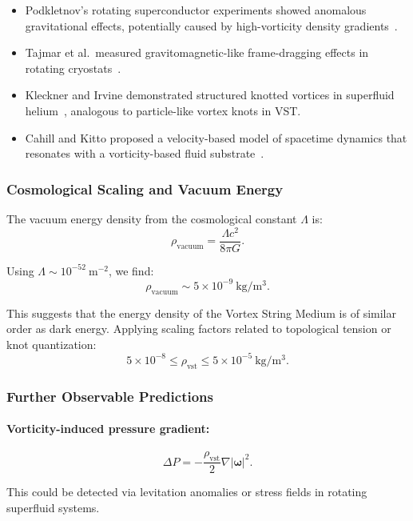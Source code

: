 \documentclass[11pt]{article}
\begin{document}
    \begin{itemize}
        \item Podkletnov's rotating superconductor experiments showed anomalous gravitational effects, potentially caused by high-vorticity density gradients~\cite{Podkletnov1992}.
        \item Tajmar et al.\ measured gravitomagnetic-like frame-dragging effects in rotating cryostats~\cite{Tajmar2006}.
        \item Kleckner and Irvine demonstrated structured knotted vortices in superfluid helium~\cite{kleckner2013}, analogous to particle-like vortex knots in VST.
        \item Cahill and Kitto proposed a velocity-based model of spacetime dynamics that resonates with a vorticity-based fluid substrate~\cite{cahill2005}.
    \end{itemize}

    \subsubsection*{Cosmological Scaling and Vacuum Energy}

    The vacuum energy density from the cosmological constant \( \Lambda \) is:
    \[
        \rho_\text{vacuum} = \frac{\Lambda c^2}{8\pi G}.
    \]

    Using \( \Lambda \sim 10^{-52}~\mathrm{m}^{-2} \), we find:
    \[
        \rho_\text{vacuum} \sim 5 \times 10^{-9}~\mathrm{kg/m^3}.
    \]

    This suggests that the energy density of the Vortex String Medium is of similar order as dark energy. Applying scaling factors related to topological tension or knot quantization:
    \[
        5 \times 10^{-8} \leq \rho_\text{vst} \leq 5 \times 10^{-5}~\mathrm{kg/m^3}.
    \]

    \subsubsection*{Further Observable Predictions}

    \paragraph{Vorticity-induced pressure gradient:}
    \[
        \Delta P = -\frac{\rho_\text{vst}}{2} \nabla |\boldsymbol{\omega}|^2.
    \]

    This could be detected via levitation anomalies or stress fields in rotating superfluid systems.
\end{document}
